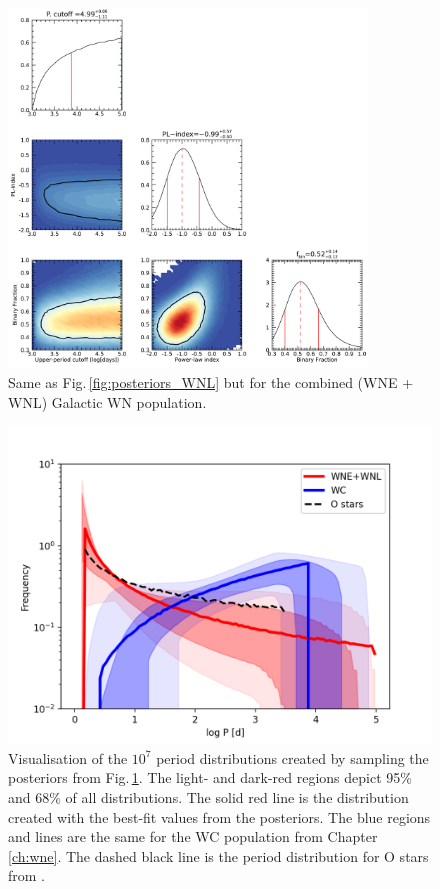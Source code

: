 \begin{figure}[ht]
    \centering
    \includegraphics[width=0.85\textwidth]{chapters/WNL/image/WNall_May18_4RVbins_stat9.png}
    \caption{Same as Fig.\,\ref{fig:posteriors_WNL} but for the combined (WNE + WNL) Galactic WN population.}
    \label{fig:posteriors_WN}
\end{figure}

\begin{figure}
    \centering
    \includegraphics[width=\hsize]{chapters/WNL/image/WNall_sampled_periods_log.png}
    \caption{Visualisation of the $10^7$ period distributions created by sampling the posteriors from Fig.\,\ref{fig:posteriors_WN}. The light- and dark-red regions depict 95\% and 68\% of all distributions. The solid red line is the distribution created with the best-fit values from the posteriors. The blue regions and lines are the same for the WC population from Chapter \ref{ch:wne}. The dashed black line is the period distribution for O stars from \citet{sana_binary_2012}.}
    \label{fig:pdist_WN_WC}
\end{figure}
